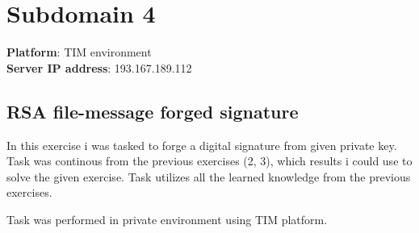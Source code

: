 \section{Subdomain 4}
\textbf{Platform}: TIM environment\\
\textbf{Server IP address}: 193.167.189.112

\subsection{RSA file-message forged signature} \label{ss: issue-4}
In this exercise i was tasked to forge a digital signature from given private key. Task was continous 
from the previous exercises (2, 3), which results i could use to solve the given exercise.
Task utilizes all the learned knowledge from the previous exercises.

Task was performed in private environment using TIM platform.

